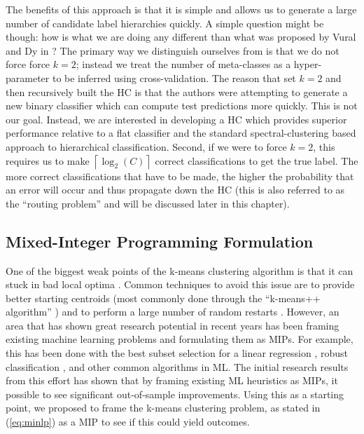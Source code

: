 \documentclass[../thesis.tex]{subfiles}
\begin{document}
The benefits of this approach is that it is simple and allows us to generate a
large number of candidate label hierarchies quickly. A simple question might be
though: how is what we are doing any different than what was proposed by Vural
and Dy in \cite{vural2004hierarchical}? The primary way we distinguish ourselves
from \cite{vural2004hierarchical} is that we do not force force $k=2$; instead
we treat the number of meta-classes as a hyper-parameter to be inferred using
cross-validation. The reason that \cite{vural2004hierarchical} set $k=2$ and
then recursively built the HC is that the authors were attempting to generate a
new binary classifier which can compute test predictions more quickly. This is
not our goal. Instead, we are interested in developing a HC which provides
superior performance relative to a flat classifier and the standard
spectral-clustering based approach to hierarchical classification. Second, if we
were to force $k=2$, this requires us to make $\left \lceil \log_2(C) \right
\rceil$ correct classifications to get the true label. The more correct
classifications that have to be made, the higher the probability that an error
will occur and thus propagate down the HC (this is also referred to as the
``routing problem'' and will be discussed later in this chapter).

\subsection{Mixed-Integer Programming Formulation}
One of the biggest weak points of the k-means clustering algorithm is that it
can stuck in bad local optima \cite{hartigan1979algorithm}. Common techniques to
avoid this issue are to provide better starting centroids (most commonly done
through the ``k-means++ algorithm'' \cite{arthur2007k}) and to perform a large
number of random restarts \cite{dick2014many}. However, an area that has shown
great research potential in recent years has been framing existing machine
learning problems and formulating them as MIPs.  For example, this has been done
with the best subset selection for a linear regression \cite{bertsimas2016best},
robust classification \cite{bertsimas2018robust}, and other common algorithms in
ML. The initial research results from this effort has shown that by framing
existing ML heuristics as MIPs, it possible to see significant out-of-sample
improvements. Using this as a starting point, we proposed to frame the k-means
clustering problem, as stated in (\ref{eq:minlp}) as a MIP to see if this could
yield outcomes.
\end{document}
